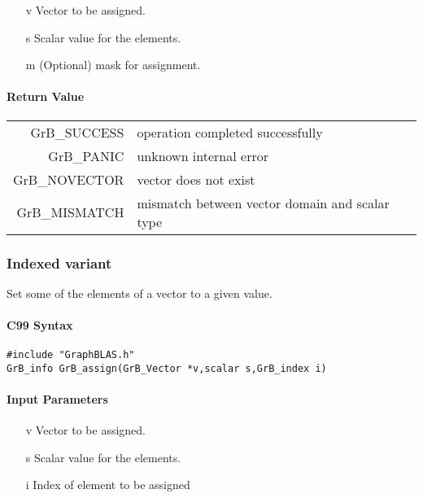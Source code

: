 \documentclass[11pt]{extarticle}
\begin{document}
\begin{itemize}
	\item[{\sf v}] Vector to be assigned.
	\item[{\sf s}] Scalar value for the elements.
	\item[{\sf m}] (Optional) mask for assignment.
\end{itemize}

\paragraph{Return Value}

\begin{tabular}{rl}
{\sf GrB\_SUCCESS}	& operation completed successfully \\
{\sf GrB\_PANIC}	& unknown internal error \\
{\sf GrB\_NOVECTOR}	& vector does not exist \\
{\sf GrB\_MISMATCH}	& mismatch between vector domain and scalar type \\
\end{tabular}

\subsubsection{Indexed variant}

Set some of the elements of a vector to a given value.

\paragraph{C99 Syntax}

\begin{verbatim}
#include "GraphBLAS.h"
GrB_info GrB_assign(GrB_Vector *v,scalar s,GrB_index i)
\end{verbatim}

\paragraph{Input Parameters}

\begin{itemize}
	\item[{\sf v}] Vector to be assigned.
	\item[{\sf s}] Scalar value for the elements.
	\item[{\sf i}] Index of element to be assigned
\end{itemize}
\end{document}

